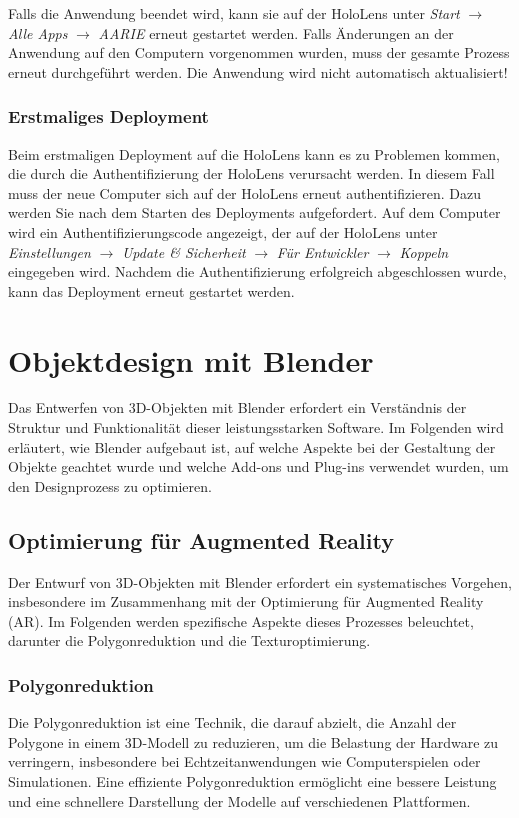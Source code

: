 Falls die Anwendung beendet wird, kann sie auf der HoloLens unter
\textit{Start} $\rightarrow$ \textit{Alle Apps} $\rightarrow$ \textit{AARIE} erneut gestartet werden.
Falls Änderungen an der Anwendung auf den Computern vorgenommen wurden, muss der gesamte Prozess erneut durchgeführt werden.
Die Anwendung wird nicht automatisch aktualisiert!

\subsubsection{Erstmaliges Deployment}
Beim erstmaligen Deployment auf die HoloLens kann es zu Problemen kommen, die durch die Authentifizierung der HoloLens
verursacht werden. In diesem Fall muss der neue Computer sich auf der HoloLens erneut authentifizieren. Dazu werden Sie nach
dem Starten des Deployments aufgefordert. Auf dem Computer wird ein Authentifizierungscode angezeigt, der auf der HoloLens unter
\textit{Einstellungen} $\rightarrow$ \textit{Update & Sicherheit} $\rightarrow$ \textit{Für Entwickler} $\rightarrow$ \textit{Koppeln}
eingegeben wird. Nachdem die Authentifizierung erfolgreich abgeschlossen wurde, kann das Deployment erneut gestartet werden.


\section{Objektdesign mit Blender} 
Das Entwerfen von 3D-Objekten mit Blender erfordert ein Verständnis der Struktur und Funktionalität dieser leistungsstarken
Software. Im Folgenden wird erläutert, wie Blender aufgebaut ist, auf welche Aspekte bei der Gestaltung der Objekte geachtet
wurde und welche Add-ons und Plug-ins verwendet wurden, um den Designprozess zu optimieren.

\subsection{Optimierung für Augmented Reality}
Der Entwurf von 3D-Objekten mit Blender erfordert ein systematisches Vorgehen, insbesondere im Zusammenhang mit der
Optimierung für Augmented Reality (AR). Im Folgenden werden spezifische Aspekte dieses Prozesses beleuchtet, darunter
die Polygonreduktion und die Texturoptimierung.

\subsubsection{Polygonreduktion}
Die Polygonreduktion ist eine Technik, die darauf abzielt, die Anzahl der Polygone in einem 3D-Modell zu reduzieren, um
die Belastung der Hardware zu verringern, insbesondere bei Echtzeitanwendungen wie Computerspielen oder Simulationen.
Eine effiziente Polygonreduktion ermöglicht eine bessere Leistung und eine schnellere Darstellung der Modelle auf
verschiedenen Plattformen.

